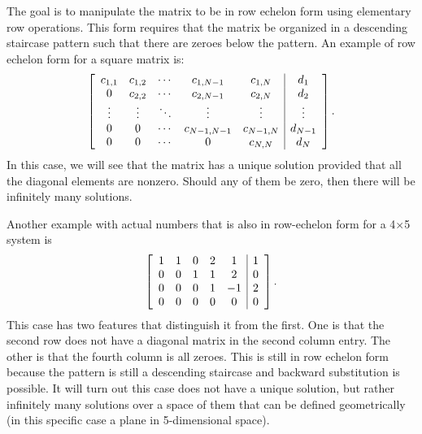 The goal is to manipulate the matrix to be in row echelon form using elementary row operations. This form requires that the matrix be organized in a descending staircase pattern such that there are zeroes below the pattern. An example of row echelon form for a square matrix is:
\begin{align}
  \left[ \begin{array}{c c c c c | c} c_{1,1} & c_{1,2} & \cdots & c_{1,N-1} 	& c_{1,N}   & d_1 \\
  								      0 	  & c_{2,2} & \cdots & c_{2,N-1} 	& c_{2,N}   & d_2 \\
								      \vdots  & \vdots  & \ddots & \vdots    	& \vdots    & \vdots \\
									  0		  & 0 		& \cdots & c_{N-1,N-1} 	& c_{N-1,N} & d_{N-1} \\ 
								      0 	  & 0 		& \cdots & 0			& c_{N,N}   & d_N \\ \end{array} \right] . \nonumber
\end{align}
In this case, we will see that the matrix has a unique solution provided that all the diagonal elements are nonzero. Should any of them be zero, then there will be infinitely many solutions. 

Another example with actual numbers that is also in row-echelon form for a 4$\times$5 system is
\begin{align}
  \left[ \begin{array}{c c c c c | c} 1		  & 1		&  0		& 2			    & 1			& 1		\\
  								      0 	  & 0		&  1	 	& 1				& 2		   	& 0		\\
									  0		  & 0 		&  0  		& 1			 	& -1	    & 2		\\ 
								      0 	  & 0 		&  0		& 0				&  0	    & 0  	\\ \end{array} \right] . \nonumber
\end{align}
This case has two features that distinguish it from the first. One is that the second row does not have a diagonal matrix in the second column entry. The other is that the fourth column is all zeroes. This is still in row echelon form because the pattern is still a descending staircase and backward substitution is possible. It will turn out this case does not have a unique solution, but rather infinitely many solutions over a space of them that can be defined geometrically (in this specific case a plane in 5-dimensional space).

